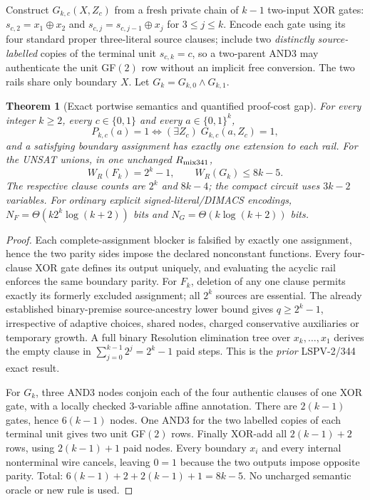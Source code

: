 \documentclass[11pt]{article}
\newtheorem{theorem}{Theorem}
\begin{document}
Construct $G_{k,c}(X,Z_c)$ from a fresh private chain of $k-1$ two-input XOR gates: $s_{c,2}=x_1\oplus x_2$ and $s_{c,j}=s_{c,j-1}\oplus x_j$ for $3\le j\le k$. Encode each gate using its four standard proper three-literal source clauses; include two \emph{distinctly source-labelled} copies of the terminal unit $s_{c,k}=c$, so a two-parent AND3 may authenticate the unit GF$(2)$ row without an implicit free conversion. The two rails share only boundary $X$. Let $G_k=G_{k,0}\wedge G_{k,1}$.

\begin{theorem}[Exact portwise semantics and quantified proof-cost gap]
For every integer $k\ge2$, every $c\in\{0,1\}$ and every $a\in\{0,1\}^k$,
\[
P_{k,c}(a)=1\iff (\exists Z_c)\;G_{k,c}(a,Z_c)=1,
\]
and a satisfying boundary assignment has exactly one extension to each rail. For the UNSAT unions, in \emph{one unchanged} $R_{\rm mix341}$,
\[
\boxed{W_R(F_k)=2^k-1,\qquad W_R(G_k)\le 8k-5.}
\]
The respective clause counts are $2^k$ and $8k-4$; the compact circuit uses $3k-2$ variables. For ordinary explicit signed-literal/DIMACS encodings,
$N_F=\Theta(k2^k\log(k+2))$ bits and $N_G=\Theta(k\log(k+2))$ bits.
\end{theorem}
\begin{proof}
Each complete-assignment blocker is falsified by exactly one assignment, hence the two parity sides impose the declared nonconstant functions. Every four-clause XOR gate defines its output uniquely, and evaluating the acyclic rail enforces the same boundary parity. For $F_k$, deletion of any one clause permits exactly its formerly excluded assignment; all $2^k$ sources are essential. The already established binary-premise source-ancestry lower bound gives $q\ge2^k-1$, irrespective of adaptive choices, shared nodes, charged conservative auxiliaries or temporary growth. A full binary Resolution elimination tree over $x_k,\ldots,x_1$ derives the empty clause in $\sum_{j=0}^{k-1}2^j=2^k-1$ paid steps. This is the \emph{prior} LSPV-2/344 exact result.

For $G_k$, three AND3 nodes conjoin each of the four authentic clauses of one XOR gate, with a locally checked 3-variable affine annotation. There are $2(k-1)$ gates, hence $6(k-1)$ nodes. One AND3 for the two labelled copies of each terminal unit gives two unit GF$(2)$ rows. Finally XOR-add all $2(k-1)+2$ rows, using $2(k-1)+1$ paid nodes. Every boundary $x_i$ and every internal nonterminal wire cancels, leaving $0=1$ because the two outputs impose opposite parity. Total: $6(k-1)+2+2(k-1)+1=8k-5$. No uncharged semantic oracle or new rule is used.
\end{proof}
\end{document}
